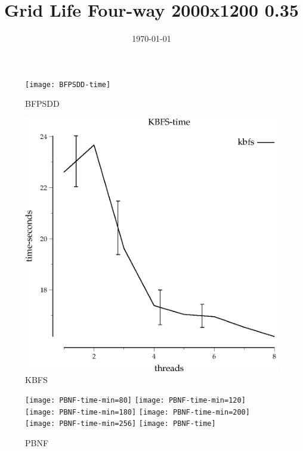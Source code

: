 \documentclass{article}
\title{Grid Life Four-way 2000x1200 0.35}
\date{\today}
\begin{document}
\maketitle

\begin{figure}
\begin{center}
\texttt{[image: BFPSDD-time]}
\end{center}
\caption{BFPSDD}
\end{figure}


\begin{figure}
\begin{center}
\includegraphics{KBFS-time}
\end{center}
\caption{KBFS}
\end{figure}

\begin{figure}
\begin{center}
\texttt{[image: PBNF-time-min=80]}
\texttt{[image: PBNF-time-min=120]}
\texttt{[image: PBNF-time-min=180]}
\texttt{[image: PBNF-time-min=200]}
\texttt{[image: PBNF-time-min=256]}
\texttt{[image: PBNF-time]}
\end{center}
\caption{PBNF}
\end{figure}
\end{document}
